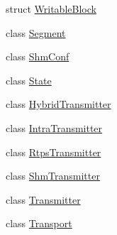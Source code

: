 \begin{DoxyCompactItemize}
struct \hyperlink{structapollo_1_1cyber_1_1transport_1_1WritableBlock}{Writable\-Block}
\item 
class \hyperlink{classapollo_1_1cyber_1_1transport_1_1Segment}{Segment}
\item 
class \hyperlink{classapollo_1_1cyber_1_1transport_1_1ShmConf}{Shm\-Conf}
\item 
class \hyperlink{classapollo_1_1cyber_1_1transport_1_1State}{State}
\item 
class \hyperlink{classapollo_1_1cyber_1_1transport_1_1HybridTransmitter}{Hybrid\-Transmitter}
\item 
class \hyperlink{classapollo_1_1cyber_1_1transport_1_1IntraTransmitter}{Intra\-Transmitter}
\item 
class \hyperlink{classapollo_1_1cyber_1_1transport_1_1RtpsTransmitter}{Rtps\-Transmitter}
\item 
class \hyperlink{classapollo_1_1cyber_1_1transport_1_1ShmTransmitter}{Shm\-Transmitter}
\item 
class \hyperlink{classapollo_1_1cyber_1_1transport_1_1Transmitter}{Transmitter}
\item 
class \hyperlink{classapollo_1_1cyber_1_1transport_1_1Transport}{Transport}
\end{DoxyCompactItemize}
